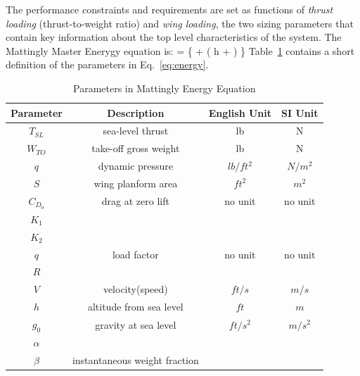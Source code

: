 \documentclass[pdftex,11pt,letter]{article}
\begin{document}
The performance constraints and requirements are set as functions of \emph{thrust loading} (thrust-to-weight ratio) and \emph{wing loading}, the two sizing parameters that contain key information about the top level characteristics of the system\cite{MattinglyText}. The Mattingly Master Enerygy equation is:
\beq\label{eq:energy}
 = \dfrac{\beta}{\alpha} 
\left\{ 
+
  \left( h + \right)
\right\}
\eeq
Table~\ref{tab:param_energy} contains a short definition of the parameters in Eq.~\ref{eq:energy}. 
\begin{table}[h]
\caption{Parameters in Mattingly Energy Equation}
\centering 
\begin{tabular}{c c c c}
\hline\hline
 {Parameter} & Description & English Unit & SI Unit\\
\hline\hline
$T_{SL}$ & sea-level thrust           & lb       & N     \\
$W_{TO}$ & take-off gross weight      & lb       & N     \\  
$q$     & dynamic pressure           & $lb/ft^2$& $N/m^2$\\ 
$S$     & wing planform area         & $ft^2$   & $m^2$  \\   
$C_{D_0}$& drag at zero lift          &  no unit & no unit\\
$K_1$   &                            &          &        \\
$K_2$   &                            &          &        \\
$q$     & load factor                & no unit &  no unit\\ 
$R$     &                            &          &        \\
$V$     &  velocity(speed)           &  $ft/s$  & $m/s$  \\
$h$     &  altitude from sea level   & $ft$     & $m$    \\
$g_0$   &  gravity at sea level      & $ft/s^2$ & $m/s^2$\\
$\alpha$&                            &          &        \\
$\beta$ & instantaneous weight fraction           &          &        \\
\hline
\end{tabular}
\label{tab:param_energy}
\end{table}
\end{document}
